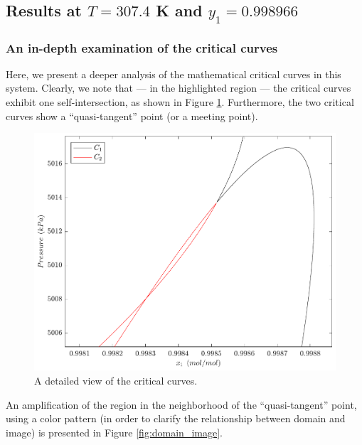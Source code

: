 \documentclass[journal=iecred,manuscript=article]{achemso}
\theoremstyle{definition}
\theoremstyle{remark}
\begin{document}
\subsection{Results at $T = 307.4 $ K and $y_1 = 0.998966$}

\subsubsection{An in-depth examination of the critical curves}

Here, we present a deeper analysis of the mathematical critical curves in this system. Clearly, we note that --- in the highlighted region --- the critical curves exhibit one self-intersection, as shown in Figure \ref{fig:sinais}. Furthermore, the two critical curves show a \enquote{quasi-tangent} point (or a meeting point).

\begin{figure}
	\begin{center}
		\includegraphics[scale=0.50]{curvas_criticas_dominio_new.pdf}
		\caption{A detailed view of the critical curves.}\label{fig:sinais}
	\end{center}
\end{figure}
 
\noindent An amplification of the region in the neighborhood of the \enquote{quasi-tangent} point, using a color pattern (in order to clarify the relationship between domain and image) is presented in Figure \ref{fig:domain_image}.
\end{document}
